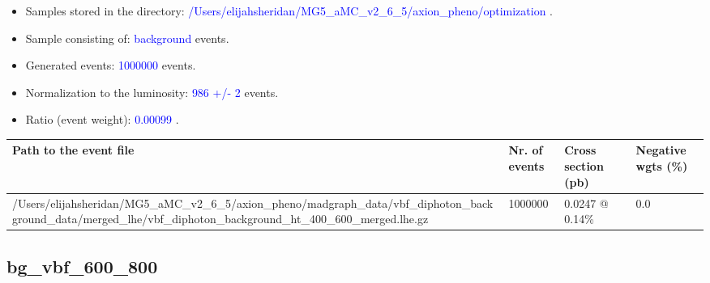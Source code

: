 \documentclass[a4paper, 10pt]{article}
\begin{document}
\begin{itemize}
  \item Samples stored in the directory: \textcolor{blue}{/\-Users/\-elijahsheridan/\-MG5\_aMC\_v2\_6\_5/\-axion\_pheno/\-optimization} .
   \item Sample consisting of: \textcolor{blue}{background}  events.
   \item Generated events: \textcolor{blue}{1000000 }  events.
   \item Normalization to the luminosity: \textcolor{blue}{986}\textcolor{blue}{ +/\-- }\textcolor{blue}{2 }  events.
   \item Ratio (event weight): \textcolor{blue}{0.00099 } .  
 
\end{itemize}
\begin{table}[H]
  \begin{center}
    \begin{tabular}{|m{55.0mm}|m{25.0mm}|m{30.0mm}|m{30.0mm}|}
      \hline
      {\cellcolor{yellow}         Path to the event file}& {\cellcolor{yellow}         Nr. of events}& {\cellcolor{yellow}         Cross section (pb)}& {\cellcolor{yellow}         Negative wgts (\%)}\\
      \hline
      {\cellcolor{white}          /\-Users/\-elijahsheridan/\-MG5\_aMC\_v2\_6\_5/\-axion\_pheno/\-madgraph\_data/\-vbf\_diphoton\_background\_data/\-merged\_lhe/\-vbf\_diphoton\_background\_ht\_400\_600\_merged.lhe.gz}& {\cellcolor{white}          1000000}& {\cellcolor{white}          0.0247 @ 0.14\%}& {\cellcolor{white}          0.0}\\
\hline
    \end{tabular}
  \end{center}
\end{table}

\subsection{ bg\_vbf\_600\_800}
\end{document}
